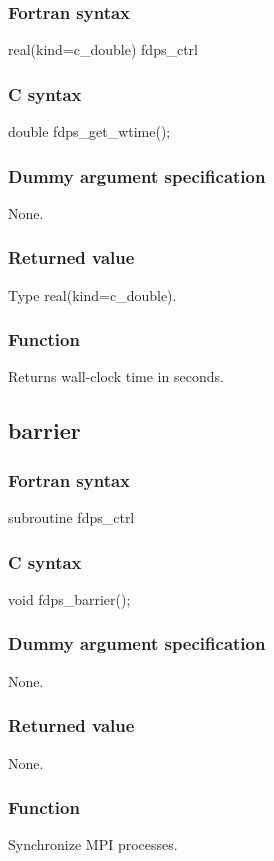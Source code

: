 \subsubsection*{Fortran syntax}
\begin{screen}
\begin{spverbatim}
real(kind=c_double) fdps_ctrl%
\end{spverbatim}
\end{screen}

\subsubsection*{C syntax}
\begin{screen}
\begin{spverbatim}
double fdps_get_wtime();
\end{spverbatim}
\end{screen}

\subsubsection*{Dummy argument specification}
None.

\subsubsection*{Returned value}
Type real(kind=c\_double).

\subsubsection*{Function}
Returns wall-clock time in seconds. 
\clearpage

\subsection{barrier}
\subsubsection*{Fortran syntax}
\begin{screen}
\begin{spverbatim}
subroutine fdps_ctrl%
\end{spverbatim}
\end{screen}

\subsubsection*{C syntax}
\begin{screen}
\begin{spverbatim}
void fdps_barrier();
\end{spverbatim}
\end{screen}

\subsubsection*{Dummy argument specification}
None.

\subsubsection*{Returned value}
None.

\subsubsection*{Function}
Synchronize MPI processes.